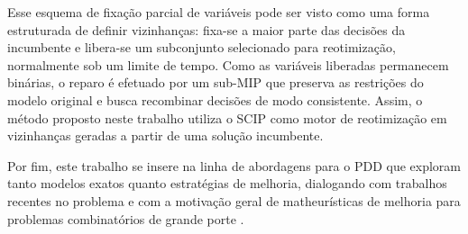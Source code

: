 Esse esquema de fixação parcial de variáveis pode ser visto como uma forma estruturada de definir vizinhanças: fixa-se a maior parte das decisões da incumbente e libera-se um subconjunto selecionado para reotimização, normalmente sob um limite de tempo. Como as variáveis liberadas permanecem binárias, o reparo é efetuado por um sub-MIP que preserva as restrições do modelo original e busca recombinar decisões de modo consistente. Assim, o método proposto neste trabalho utiliza o SCIP \cite{gamrath_2020_scip} como motor de reotimização em vizinhanças geradas a partir de uma solução incumbente.

Por fim, este trabalho se insere na linha de abordagens para o PDD que exploram tanto modelos exatos quanto estratégias de melhoria, dialogando com trabalhos recentes no problema \cite{silva2024abordagem_exata_dpd} e com a motivação geral de matheurísticas de melhoria para problemas combinatórios de grande porte \cite{silva2024matheuristica_mochila}.
